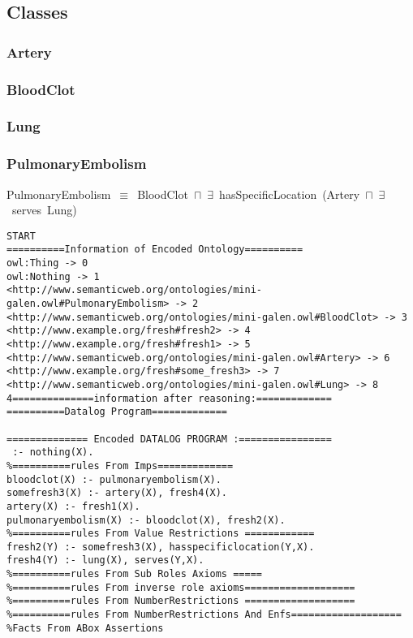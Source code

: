 \documentclass{article}
\begin{document}
\subsection*{Classes}

\subsubsection*{Artery}

\subsubsection*{BloodClot}

\subsubsection*{Lung}

\subsubsection*{PulmonaryEmbolism}

PulmonaryEmbolism~\ensuremath{\equiv}~BloodClot~\ensuremath{\sqcap}~\ensuremath{\exists}~hasSpecificLocation~(Artery~\ensuremath{\sqcap}~\ensuremath{\exists}~serves~Lung)

\begin{verbatim}
START
==========Information of Encoded Ontology==========
owl:Thing -> 0
owl:Nothing -> 1
<http://www.semanticweb.org/ontologies/mini-galen.owl#PulmonaryEmbolism> -> 2
<http://www.semanticweb.org/ontologies/mini-galen.owl#BloodClot> -> 3
<http://www.example.org/fresh#fresh2> -> 4
<http://www.example.org/fresh#fresh1> -> 5
<http://www.semanticweb.org/ontologies/mini-galen.owl#Artery> -> 6
<http://www.example.org/fresh#some_fresh3> -> 7
<http://www.semanticweb.org/ontologies/mini-galen.owl#Lung> -> 8
4==============information after reasoning:=============
==========Datalog Program=============

============== Encoded DATALOG PROGRAM :================ 
 :- nothing(X).
%==========rules From Imps=============
bloodclot(X) :- pulmonaryembolism(X).
somefresh3(X) :- artery(X), fresh4(X).
artery(X) :- fresh1(X).
pulmonaryembolism(X) :- bloodclot(X), fresh2(X).
%==========rules From Value Restrictions ============
fresh2(Y) :- somefresh3(X), hasspecificlocation(Y,X).
fresh4(Y) :- lung(X), serves(Y,X).
%==========rules From Sub Roles Axioms =====
%==========rules From inverse role axioms===================
%==========rules From NumberRestrictions ===================
%==========rules From NumberRestrictions And Enfs===================
%Facts From ABox Assertions
\end{verbatim}
\end{document}
